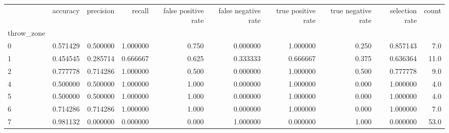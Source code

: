 \begin{tabular}{lrrrrrrrrr}
\toprule
{} &  accuracy &  precision &    recall &  false positive rate &  false negative rate &  true positive rate &  true negative rate &  selection rate &  count \\
throw\_zone &           &            &           &                      &                      &                     &                     &                 &        \\
\midrule
0          &  0.571429 &   0.500000 &  1.000000 &                0.750 &             0.000000 &            1.000000 &               0.250 &        0.857143 &    7.0 \\
1          &  0.454545 &   0.285714 &  0.666667 &                0.625 &             0.333333 &            0.666667 &               0.375 &        0.636364 &   11.0 \\
2          &  0.777778 &   0.714286 &  1.000000 &                0.500 &             0.000000 &            1.000000 &               0.500 &        0.777778 &    9.0 \\
4          &  0.500000 &   0.500000 &  1.000000 &                1.000 &             0.000000 &            1.000000 &               0.000 &        1.000000 &    4.0 \\
5          &  0.500000 &   0.500000 &  1.000000 &                1.000 &             0.000000 &            1.000000 &               0.000 &        1.000000 &    4.0 \\
6          &  0.714286 &   0.714286 &  1.000000 &                1.000 &             0.000000 &            1.000000 &               0.000 &        1.000000 &    7.0 \\
7          &  0.981132 &   0.000000 &  0.000000 &                0.000 &             1.000000 &            0.000000 &               1.000 &        0.000000 &   53.0 \\
\bottomrule
\end{tabular}
